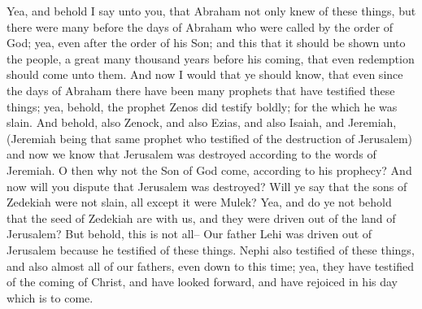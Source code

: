 Yea, and behold I say unto you, that Abraham not only knew of these things, but there were many before the days of Abraham who were called by the order of God; yea, even after the order of his Son; and this that it should be shown unto the people, a great many thousand years before his coming, that even redemption should come unto them.
\bverse \iffalse And now I would that ye should know, that even since the days of Abraham there have been many prophets that have testified these things; yea, behold, the prophet Zenos did testify boldly; for the which he was slain. \fi
And now I would that ye should know, that even since the days of Abraham there have been many prophets that have testified these things; yea, behold, the prophet Zenos did testify boldly; for the which he was slain.
\bverse \iffalse And behold, also Zenock, and also Ezias, and also Isaiah, and Jeremiah, (Jeremiah being that same prophet who testified of the destruction of Jerusalem) and now we know that Jerusalem was destroyed according to the words of Jeremiah. O then why not the Son of God come, according to his prophecy? \fi
And behold, also Zenock, and also Ezias, and also Isaiah, and Jeremiah, (Jeremiah being that same prophet who testified of the destruction of Jerusalem) and now we know that Jerusalem was destroyed according to the words of Jeremiah. O then why not the Son of God come, according to his prophecy?
\bverse \iffalse And now will you dispute that Jerusalem was destroyed? Will ye say that the sons of Zedekiah were not slain, all except it were Mulek? Yea, and do ye not behold that the seed of Zedekiah are with us, and they were driven out of the land of Jerusalem?  But behold, this is not all-- \fi
And now will you dispute that Jerusalem was destroyed? Will ye say that the sons of Zedekiah were not slain, all except it were Mulek? Yea, and do ye not behold that the seed of Zedekiah are with us, and they were driven out of the land of Jerusalem?  But behold, this is not all--
\bverse \iffalse Our father Lehi was driven out of Jerusalem because he testified of these things. Nephi also testified of these things, and also almost all of our fathers, even down to this time; yea, they have testified of the coming of Christ, and have looked forward, and have rejoiced in his day which is to come. \fi
Our father Lehi was driven out of Jerusalem because he testified of these things. Nephi also testified of these things, and also almost all of our fathers, even down to this time; yea, they have testified of the coming of Christ, and have looked forward, and have rejoiced in his day which is to come.
